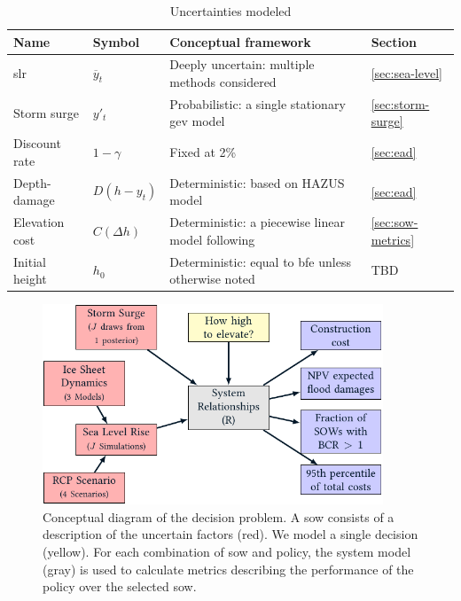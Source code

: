 \documentclass[12pt]{article}
\begin{document}
\begin{table}
    \centering
    \begin{tabular}{l l p{3in} l}
        \toprule
        Name           & Symbol           & Conceptual framework                                                                 & Section               \\
        \midrule
        \Gls{slr}      & $\overline{y}_t$ & Deeply uncertain: multiple methods considered                                        & \ref{sec:sea-level}   \\
        Storm surge    & $y'_t$           & Probabilistic: a single stationary \acrshort{gev} model                              & \ref{sec:storm-surge} \\
        Discount rate  & $1-\gamma$       & Fixed at 2\%                                                                         & \ref{sec:ead}         \\
        Depth-damage   & $D(h-y_t)$       & Deterministic: based on HAZUS model                                                  & \ref{sec:ead}         \\
        Elevation cost & $C(\Delta h)$    & Deterministic: a piecewise linear model following \citet{zarekarizi_suboptimal:2020} & \ref{sec:sow-metrics} \\
        Initial height & $h_0$            & Deterministic: equal to \gls{bfe} unless otherwise noted                             & TBD                   \\
        \bottomrule
    \end{tabular}
    \caption{Uncertainties modeled}\label{tab:uncertainties}
\end{table}

\begin{figure}
    \centering
    \includegraphics[width=4in]{xlrm.pdf}
    \caption{
        Conceptual diagram of the decision problem.
        A \gls{sow} consists of a description of the uncertain factors (red).
        We model a single decision (yellow).
        For each combination of \gls{sow} and policy, the system model (gray) is used to calculate metrics describing the performance of the policy over the selected \gls{sow}.
    }
\end{figure}
\end{document}
